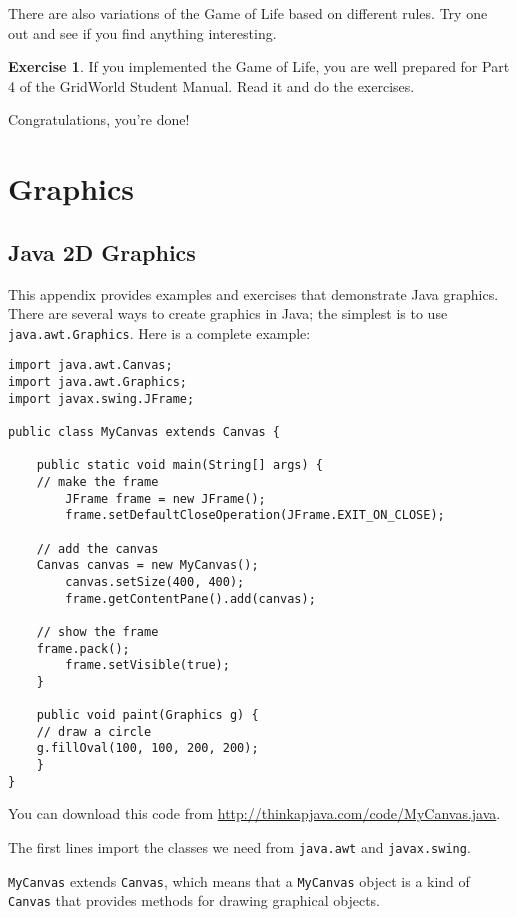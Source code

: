 \documentclass[12pt]{book}
\theoremstyle{definition}
\newtheorem{excz}{Exercise}[chapter]
\newenvironment{exercise}{\bigskip\begin{excz}\mbox{}}{\end{excz}}
\begin{document}
There are also variations of the Game of Life based on different rules.
Try one out and see if you find anything interesting.

\begin{exercise}
If you implemented the Game of Life, you are well prepared for
Part 4 of the GridWorld Student Manual.  Read it and do the exercises.
\end{exercise}

Congratulations, you're done!



\appendix

\chapter{Graphics}
\label{graphics}

\section{Java 2D Graphics}

This appendix provides examples and exercises that demonstrate Java
graphics.  There are several ways to create graphics in Java; the
simplest is to use {\tt java.awt.Graphics}.
Here is a complete example:

\begin{lstlisting}
import java.awt.Canvas;
import java.awt.Graphics;
import javax.swing.JFrame;

public class MyCanvas extends Canvas {

    public static void main(String[] args) {
	// make the frame
        JFrame frame = new JFrame();
        frame.setDefaultCloseOperation(JFrame.EXIT_ON_CLOSE);

	// add the canvas
	Canvas canvas = new MyCanvas();
        canvas.setSize(400, 400);
        frame.getContentPane().add(canvas);

	// show the frame
	frame.pack();
        frame.setVisible(true);
    }

    public void paint(Graphics g) {
	// draw a circle
	g.fillOval(100, 100, 200, 200);
    }
}
\end{lstlisting}
%
You can download this code from
\url{http://thinkapjava.com/code/MyCanvas.java}.

The first lines import the classes we need from {\tt java.awt}
and {\tt javax.swing}.

{\tt MyCanvas} extends {\tt Canvas}, which means that a
{\tt MyCanvas} object is a kind of {\tt Canvas} that provides
methods for drawing graphical objects.
\end{document}
